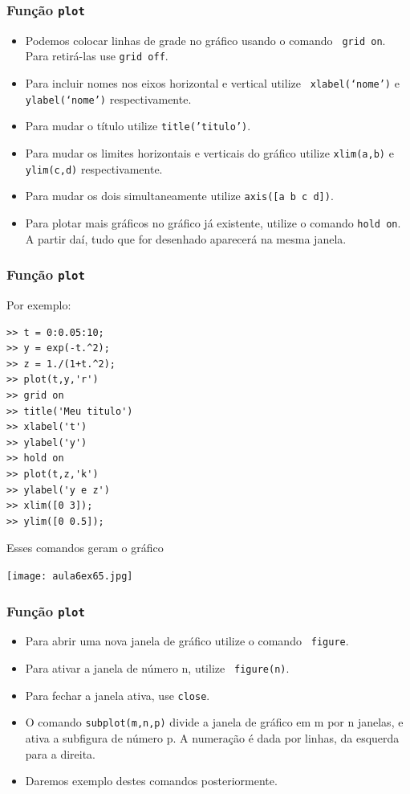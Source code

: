 \documentclass{beamer}
\newcommand{\ssiz}{\scriptsize}
\begin{document}
\begin{frame}
\frametitle{Fun\c{c}\~ao {\tt plot}}

\begin{itemize}
 \item<1-> Podemos colocar linhas de grade no gr\'afico usando o comando {\tt
grid on}. Para retir\'a-las use {\tt grid off}.
 \item<2-> Para incluir nomes nos eixos horizontal e vertical utilize {\tt
xlabel(`nome')} e {\tt ylabel(`nome')} respectivamente.
 \item<3-> Para mudar o t\'itulo utilize {\tt title('titulo')}.
 \item<4-> Para mudar os limites horizontais e verticais do gr\'afico utilize
{\tt xlim(a,b)} e {\tt ylim(c,d)} respectivamente.
 \item<5-> Para mudar os dois simultaneamente utilize {\tt axis([a b c d])}.
 \item<6-> Para plotar mais gr\'aficos no gr\'afico j\'a existente, utilize o
comando {\tt hold on}. A partir da\'i, tudo que for desenhado aparecer\'a na
mesma janela.
\end{itemize}

\end{frame}

\begin{frame}[fragile]
 \frametitle{Fun\c{c}\~ao {\tt plot}}

Por exemplo:

\begin{multicols}{2}
{\ssiz
\begin{verbatim}
>> t = 0:0.05:10;
>> y = exp(-t.^2);
>> z = 1./(1+t.^2);
>> plot(t,y,'r')
>> grid on
>> title('Meu titulo')
>> xlabel('t')
>> ylabel('y')
>> hold on
>> plot(t,z,'k')
>> ylabel('y e z')
>> xlim([0 3]);
>> ylim([0 0.5]);
\end{verbatim}

\pause
Esses comandos geram o gr\'afico
\begin{center}
\texttt{[image: aula6ex65.jpg]}
\end{center}
}
\end{multicols}

\end{frame}


\begin{frame}
\frametitle{Fun\c{c}\~ao {\tt plot}}

\begin{itemize}
 \item<1-> Para abrir uma nova janela de gr\'afico utilize o comando {\tt
figure}.
 \item<2-> Para ativar a janela de n\'umero n, utilize {\tt
figure(n)}.
 \item<3-> Para fechar a janela ativa, use {\tt close}.
 \item<4-> O comando {\tt subplot(m,n,p)} divide a janela de gr\'afico em m por
n janelas, e ativa a subfigura de n\'umero p. A numera\c{c}\~ao \'e dada por
linhas, da esquerda para a direita.
 \item<5-> Daremos exemplo destes comandos posteriormente.
\end{itemize}

\end{frame}
\end{document}
